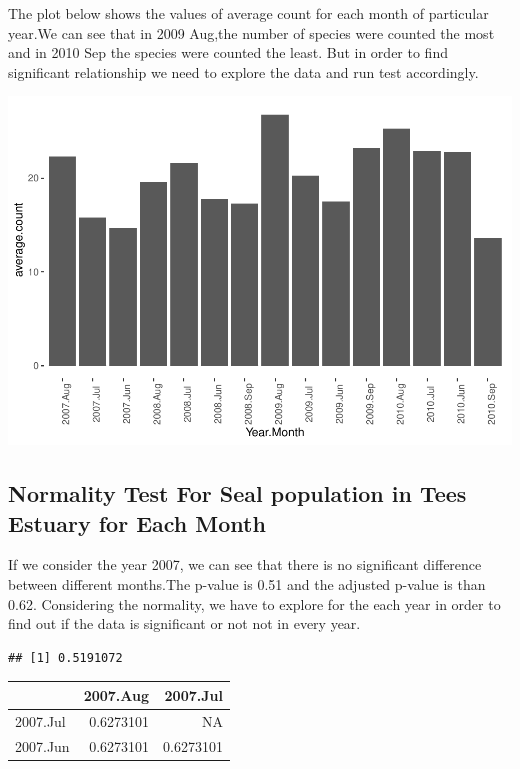 \documentclass[
]{article}
\begin{document}
The plot below shows the values of average count for each month of
particular year.We can see that in 2009 Aug,the number of species were
counted the most and in 2010 Sep the species were counted the least. But
in order to find significant relationship we need to explore the data
and run test accordingly.

\includegraphics{Statistical-analysis-in-RStudio_files/figure-latex/unnamed-chunk-10-1.pdf}

\hypertarget{normality-test-for-seal-population-in-tees-estuary-for-each-month}{%
\subsection{Normality Test For Seal population in Tees Estuary for Each
Month}\label{normality-test-for-seal-population-in-tees-estuary-for-each-month}}

If we consider the year 2007, we can see that there is no significant
difference between different months.The p-value is 0.51 and the adjusted
p-value is than 0.62. Considering the normality, we have to explore for
the each year in order to find out if the data is significant or not not
in every year.

\begin{verbatim}
## [1] 0.5191072
\end{verbatim}

\begin{longtable}[]{@{}lrr@{}}
\toprule
& 2007.Aug & 2007.Jul\tabularnewline
\midrule
\endhead
2007.Jul & 0.6273101 & NA\tabularnewline
2007.Jun & 0.6273101 & 0.6273101\tabularnewline
\bottomrule
\end{longtable}
\end{document}
